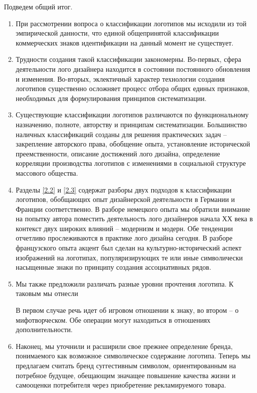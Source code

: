 Подведем общий итог.
\begin{enumerate}
\item При рассмотрении вопроса о классификации логотипов мы исходили из той
  эмпирической данности, что единой общепринятой классификации коммерческих
  знаков идентификации на данный момент не существует.
\item Трудности создания такой классификации закономерны. Во-первых, сфера
  деятельности лого дизайнера находится в состоянии постоянного обновления и
  изменения. Во-вторых, эклектичный характер технологии создания логотипов
  существенно осложняет процесс отбора общих единых признаков, необходимых для
  формулирования принципов систематизации.
\item Существующие классификации логотипов различаются по функциональному
  назначению, полноте, авторству и принципам систематизации. Большинство
  наличных классификаций созданы для решения практических задач -- закрепление авторского права, обобщение опыта, установление исторической
  преемственности, описание достижений лого дизайна, определение корреляции
  производства логотипов с изменениями в социальной структуре массового
  общества.
\item Разделы \ref{2.2} и \ref{2.3} содержат разборы двух подходов к
  классификации логотипов, обобщающих опыт дизайнерской деятельности в
  Германии и Франции соответственно. В разборе немецкого опыта мы обратили
  внимание на попытку автора поместить деятельность лого дизайнеров начала
  ХХ века в контекст двух широких влияний -- модернизм и модерн. Обе тенденции
  отчетливо прослеживаются в практике лого дизайна сегодня. В разборе
  французского опыта акцент был сделан на культурно-исторический аспект
  изображений на логотипах, популяризирующих те или иные символически насыщенные
  знаки по принципу создания ассоциативных рядов.
\item Мы также предложили различать разные уровни прочтения
  логотипа. К таковым мы отнесли
  В первом случае речь идет об игровом отношении к знаку, во втором -- о
  мифотворческом. Обе операции могут находиться в отношениях дополнительности.
\item Наконец, мы уточнили и расширили свое прежнее определение бренда,
  понимаемого как возможное символическое содержание логотипа. Теперь мы
  предлагаем считать бренд суггестивным символом, ориентированным на потребное
  будущее, обещающим значащее повышение качества жизни и самооценки потребителя
  через приобретение рекламируемого товара.
\end{enumerate}

